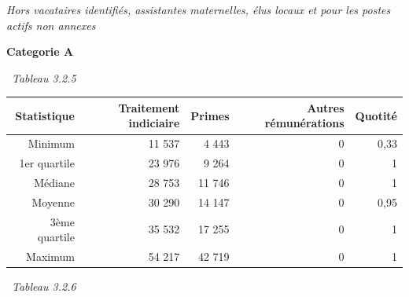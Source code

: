 \emph{Hors vacataires identifiés, assistantes maternelles, élus locaux
et pour les postes actifs non annexes}

\textbf{Categorie A}

~\emph{Tableau 3.2.5}

\begin{longtable}[]{@{}rrrrr@{}}
\toprule
Statistique & Traitement indiciaire & Primes & Autres rémunérations &
Quotité\tabularnewline
\midrule
\endhead
Minimum & 11 537 & 4 443 & 0 & 0,33\tabularnewline
1er quartile & 23 976 & 9 264 & 0 & 1\tabularnewline
Médiane & 28 753 & 11 746 & 0 & 1\tabularnewline
Moyenne & 30 290 & 14 147 & 0 & 0,95\tabularnewline
3ème quartile & 35 532 & 17 255 & 0 & 1\tabularnewline
Maximum & 54 217 & 42 719 & 0 & 1\tabularnewline
\bottomrule
\end{longtable}

~\emph{Tableau 3.2.6}

